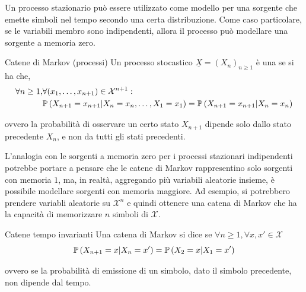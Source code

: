 Un processo stazionario può essere utilizzato come modello per una sorgente che emette simboli nel tempo secondo una certa distribuzione.
Come caso particolare, se le variabili membro sono indipendenti, allora il processo può modellare una sorgente a memoria zero.

\begin{definition}{Catene di Markov (processi)}
  Un processo stocastico \(\underline{X} = {(X_n)}_{n\geq 1}\) è una  se si ha che, 
  \[\begin{aligned}
    \forall n \geq 1, & \forall (x_1, \ldots, x_{n+1}) \in \mathcal{X}^{n+1}: \\
                      & \Prob[X_{n+1} = x_{n+1}|X_n = x_n, \ldots, X_1 = x_1] = \Prob[X_{n+1} = x_{n+1}|X_n = x_n]
  \end{aligned}\]

  ovvero la probabilità di osservare un certo stato \(X_{n+1}\) dipende solo dallo stato precedente \(X_n\), e non da tutti gli stati precedenti.
\end{definition}

L'analogia con le sorgenti a memoria zero per i processi stazionari indipendenti potrebbe portare a pensare che le catene di Markov rappresentino solo sorgenti con memoria \(1\), ma, in realtà, aggregando più variabili aleatorie insieme, è possibile modellare sorgenti con memoria maggiore. Ad esempio, si potrebbero prendere variabli aleatorie su $\mathcal{X}^{n}$ e quindi ottenere una catena di Markov che ha la capacità di memorizzare $n$ simboli di $\mathcal{X}$.

\begin{definition}{Catene tempo invarianti}
    Una catena di Markov si dice  se \(\forall n \geq 1, \forall x,x'\in\mathcal{X}\)
  \[\Prob[X_{n+1} = x | X_n = x'] = \Prob[X_2 = x | X_1 = x']\]
  
  ovvero se la probabilità di emissione di un simbolo, dato il simbolo precedente, non dipende dal tempo.
\end{definition}

